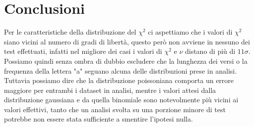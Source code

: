 \documentclass[a4paper]{article}
\begin{document}
    \section{Conclusioni}
    Per le caratteristiche della distribuzione del $\chi^2$ ci aspettiamo che i valori di
    $\chi^2$ siano vicini al numero di gradi di libertà, questo però non avviene in nessuno
    dei test effettuati, infatti nel migliore dei casi i valori di $\chi^2$ e $\nu$ distano di 
    più di $11\sigma$.
    Possiamo quindi senza ombra di dubbio escludere che la lunghezza dei versi o la frequenza
    della lettera "a" seguano alcuna delle distribuzioni prese in analisi.\\
    Tuttavia possiamo dire che la distribuzione poissoniana comporta un errore maggiore
    per entrambi i dataset in analisi, mentre i valori attesi dalla distribuzione
    gaussiana e da quella binomiale sono notevolmente più vicini ai valori effettivi,
    tanto che un analisi svolta su una porzione minore di test potrebbe non essere stata
    sufficiente a smentire l'ipotesi nulla.
\end{document}
